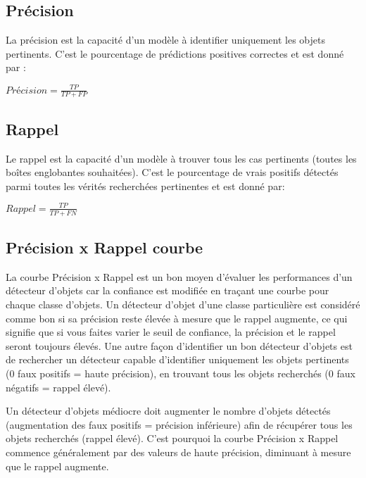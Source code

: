           \subsection{Précision}
          La précision est la capacité d'un modèle à identifier uniquement les objets pertinents. C'est le pourcentage de prédictions positives correctes et est donné par :
          \begin{center} $Précision = \frac{TP}{TP + FP}$ \end{center}

          \subsection{Rappel}
          Le rappel est la capacité d'un modèle à trouver tous les cas pertinents (toutes les boîtes englobantes souhaitées). C'est le pourcentage de vrais positifs détectés parmi toutes les vérités recherchées pertinentes et est donné par:
          \begin{center} $Rappel = \frac{TP}{TP + FN}$ \end{center}
          
          \subsection{Précision x Rappel courbe}
          La courbe Précision x Rappel est un bon moyen d'évaluer les performances d'un détecteur d'objets car la confiance est modifiée en traçant une courbe pour chaque classe d'objets. Un détecteur d'objet d'une classe particulière est considéré comme bon si sa précision reste élevée à mesure que le rappel augmente, ce qui signifie que si vous faites varier le seuil de confiance, la précision et le rappel seront toujours élevés. Une autre façon d'identifier un bon détecteur d'objets est de rechercher un détecteur capable d'identifier uniquement les objets pertinents (0 faux positifs = haute précision), en trouvant tous les objets recherchés (0 faux négatifs = rappel élevé).
          
          Un détecteur d'objets médiocre doit augmenter le nombre d'objets détectés (augmentation des faux positifs = précision inférieure) afin de récupérer tous les objets recherchés (rappel élevé). C'est pourquoi la courbe Précision x Rappel commence généralement par des valeurs de haute précision, diminuant à mesure que le rappel augmente.
          
